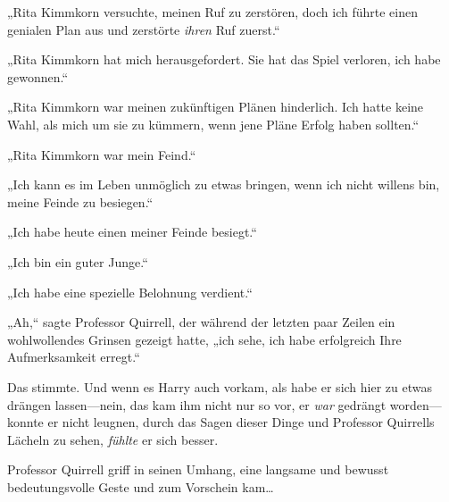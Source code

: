 {%
„Rita Kimmkorn versuchte, meinen Ruf zu zerstören, doch ich führte einen genialen Plan aus und zerstörte \emph{ihren} Ruf zuerst.“

„Rita Kimmkorn hat mich herausgefordert. Sie hat das Spiel verloren, ich habe gewonnen.“

„Rita Kimmkorn war meinen zukünftigen Plänen hinderlich. Ich hatte keine Wahl, als mich um sie zu kümmern, wenn jene Pläne Erfolg haben sollten.“

„Rita Kimmkorn war mein Feind.“

„Ich kann es im Leben unmöglich zu etwas bringen, wenn ich nicht willens bin, meine Feinde zu besiegen.“

„Ich habe heute einen meiner Feinde besiegt.“

„Ich bin ein guter Junge.“

„Ich habe eine spezielle Belohnung verdient.“

„Ah,“ sagte Professor Quirrell, der während der letzten paar Zeilen ein wohlwollendes Grinsen gezeigt hatte, „ich sehe, ich habe erfolgreich Ihre Aufmerksamkeit erregt.“

Das stimmte. Und wenn es Harry auch vorkam, als habe er sich hier zu etwas drängen lassen—nein, das kam ihm nicht nur so vor, er \emph{war} gedrängt worden—konnte er nicht leugnen, durch das Sagen dieser Dinge und Professor Quirrells Lächeln zu sehen, \emph{fühlte} er sich besser.

Professor Quirrell griff in seinen Umhang, eine langsame und bewusst bedeutungsvolle Geste und zum Vorschein kam…

}
